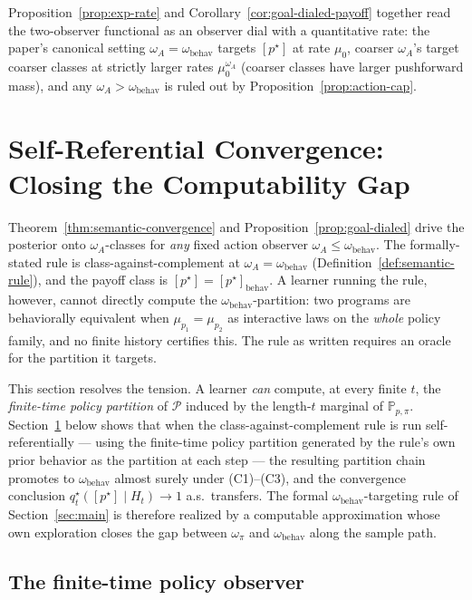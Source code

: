 \documentclass[11pt]{article}
\theoremstyle{definition}
\theoremstyle{remark}
\newcommand{\Pcal}{\mathcal{P}}
\newcommand{\Prob}{\mathbb{P}}
\begin{document}
Proposition~\ref{prop:exp-rate} and Corollary~\ref{cor:goal-dialed-payoff} together read the two-observer functional as an observer dial with a quantitative rate: the paper's canonical setting $\omega_A=\omega_{\mathrm{behav}}$ targets $[p^\star]$ at rate $\mu_0$, coarser $\omega_A$'s target coarser classes at strictly larger rates $\mu_0^{\omega_A}$ (coarser classes have larger pushforward mass), and any $\omega_A>\omega_{\mathrm{behav}}$ is ruled out by Proposition~\ref{prop:action-cap}.

\section{Self-Referential Convergence: Closing the Computability Gap}
\label{sec:self-ref}

Theorem~\ref{thm:semantic-convergence} and Proposition~\ref{prop:goal-dialed} drive the posterior onto $\omega_A$-classes for \emph{any} fixed action observer $\omega_A\le\omega_{\mathrm{behav}}$. The formally-stated rule is class-against-complement at $\omega_A=\omega_{\mathrm{behav}}$ (Definition~\ref{def:semantic-rule}), and the payoff class is $[p^\star]=[p^\star]_{\mathrm{behav}}$. A learner running the rule, however, cannot directly compute the $\omega_{\mathrm{behav}}$-partition: two programs are behaviorally equivalent when $\mu_{p_1}=\mu_{p_2}$ as interactive laws on the \emph{whole} policy family, and no finite history certifies this. The rule as written requires an oracle for the partition it targets.

This section resolves the tension. A learner \emph{can} compute, at every finite $t$, the \emph{finite-time policy partition} of $\Pcal$ induced by the length-$t$ marginal of $\Prob_{p,\pi}$. Section~\ref{sec:self-ref} below shows that when the class-against-complement rule is run self-referentially --- using the finite-time policy partition generated by the rule's own prior behavior as the partition at each step --- the resulting partition chain promotes to $\omega_{\mathrm{behav}}$ almost surely under (C1)--(C3), and the convergence conclusion $q_t^\star([p^\star]\mid H_t)\to 1$ a.s.\ transfers. The formal $\omega_{\mathrm{behav}}$-targeting rule of Section~\ref{sec:main} is therefore realized by a computable approximation whose own exploration closes the gap between $\omega_\pi$ and $\omega_{\mathrm{behav}}$ along the sample path.

\subsection{The finite-time policy observer}
\label{sec:finite-time-policy-observer}
\end{document}
